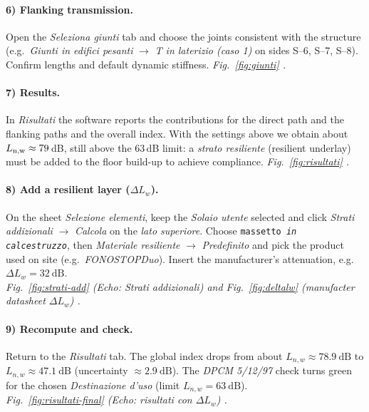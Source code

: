 \paragraph{6) Flanking transmission.}
Open the \textit{Seleziona giunti} tab and choose the joints consistent with the structure (e.g.\ \textit{Giunti in edifici pesanti} $\rightarrow$ \textit{T in laterizio (caso 1)} on sides S--6, S--7, S--8). Confirm lengths and default dynamic stiffness.  
\emph{ Fig.~\ref{fig:giunti} .}

\paragraph{7) Results.}
In \textit{Risultati} the software reports the contributions for the direct path and the flanking paths and the overall index. With the settings above we obtain about $L\textsubscript{n,w}\approx79$\,dB, still above the $63$\,dB limit: a \emph{strato resiliente} (resilient underlay) must be added to the floor build-up to achieve compliance.  
\emph{ Fig.~\ref{fig:risultati} .}

\paragraph{8) Add a resilient layer (\(\Delta L_w\)).}
On the sheet \textit{Selezione elementi}, keep the \textit{Solaio utente} selected and click
\textit{Strati addizionali} \(\rightarrow\) \textit{Calcola} on the \emph{lato superiore}.
Choose \texttt{massetto \emph{in calcestruzzo}}, then \textit{Materiale resiliente}
\(\rightarrow\) \textit{Predefinito} and pick the product used on site (e.g.\ \emph{FONOSTOPDuo}).
Insert the manufacturer’s attenuation, e.g.\ \(\Delta L_w=32~\mathrm{dB}\).
\\[2pt]
\emph{ Fig.~\ref{fig:strati-add} (Echo: Strati addizionali) and
Fig.~\ref{fig:deltalw} (manufacter datasheet \(\Delta L_w\)) .}

\paragraph{9) Recompute and check.}
Return to the \textit{Risultati} tab. The global index drops from about
\(L_{n,w}\approx 78.9~\mathrm{dB}\) to \(L_{n,w}\approx 47.1~\mathrm{dB}\)
(uncertainty \(\approx 2.9~\mathrm{dB}\)). The \textit{DPCM 5/12/97} check turns
green for the chosen \textit{Destinazione d’uso} (limit \(L_{n,w}=63~\mathrm{dB}\)).
\\[2pt]
\emph{ Fig.~\ref{fig:risultati-final} (Echo: risultati con \(\Delta L_w\)) .}

